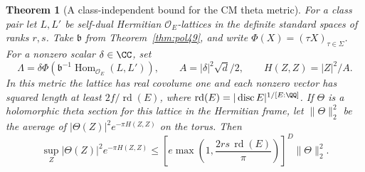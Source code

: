 \documentclass[a4paper,11pt]{article}
\newtheorem{theorem}[proposition]{Theorem}
\theoremstyle{definition}
\theoremstyle{remark}
\numberwithin{equation}{section}
\begin{document}
\begin{theorem}[A class-independent bound for the CM theta metric]\label{thm:lattice55}
For a class pair let \(L,L'\) be self-dual Hermitian
\(\mathcal O_E\)-lattices in the definite standard spaces of ranks
\(r,s\). Take \(\mathfrak b\) from Theorem~\ref{thm:pol49}, and
write \(\Phi(X)=(\tau X)_{\tau\in\Sigma}\).
For a nonzero scalar \(\delta\in\CC\), set
\[
 \Lambda=\delta\Phi\!\left(\mathfrak b^{-1}
             \operatorname{Hom}_{\mathcal O_E}(L,L')\right),
 \qquad A=|\delta|^2\sqrt d/2,\qquad H(Z,Z)=|Z|^2/A .
\]
In this metric the lattice has real covolume one and each nonzero
vector has squared length at least \(2f/\operatorname{rd}(E)\),
where \(\operatorname{rd}(E)=|\operatorname{disc}E|^{1/[E:\QQ]}\).
If \(\Theta\) is a holomorphic theta section for this lattice in
the Hermitian frame, let \(\|\Theta\|_2^2\) be the average of
\(|\Theta(Z)|^2e^{-\pi H(Z,Z)}\) on the torus. Then
\begin{equation}
 \sup_Z|\Theta(Z)|^2 e^{-\pi H(Z,Z)}
 \le \left[e\max\left(1,\frac{2rs\,\operatorname{rd}(E)}{\pi}\right)
      \right]^D\|\Theta\|_2^2.                          \label{eq:sup55}
\end{equation}
\end{theorem}
\end{document}
